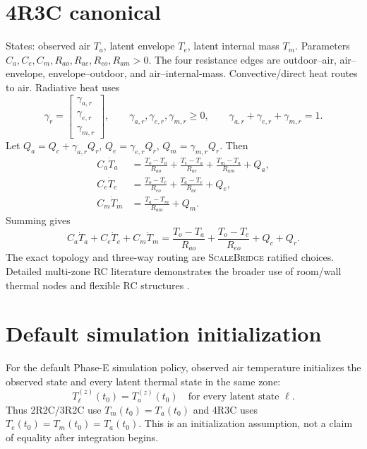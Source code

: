 \documentclass[11pt]{article}
\newcommand{\ScaleBridge}{\textsc{ScaleBridge}}
\begin{document}
\section{4R3C canonical}
States: observed air $T_a$, latent envelope $T_e$, latent internal mass $T_m$.  Parameters $C_a,C_e,C_m,R_{ao},R_{ae},R_{eo},R_{am}>0$.  The four resistance edges are outdoor--air, air--envelope, envelope--outdoor, and air--internal-mass.  Convective/direct heat routes to air.  Radiative heat uses
\[
\gamma_r=\begin{bmatrix}\gamma_{a,r}\\\gamma_{e,r}\\\gamma_{m,r}\end{bmatrix},\qquad
\gamma_{a,r},\gamma_{e,r},\gamma_{m,r}\ge0,\qquad
\gamma_{a,r}+\gamma_{e,r}+\gamma_{m,r}=1.
\]
Let $Q_a=Q_c+\gamma_{a,r}Q_r$, $Q_e=\gamma_{e,r}Q_r$, $Q_m=\gamma_{m,r}Q_r$. Then
\begin{align}
C_a\dot T_a &= \frac{T_o-T_a}{R_{ao}}+\frac{T_e-T_a}{R_{ae}}+\frac{T_m-T_a}{R_{am}}+Q_a,\\
C_e\dot T_e &= \frac{T_o-T_e}{R_{eo}}+\frac{T_a-T_e}{R_{ae}}+Q_e,\\
C_m\dot T_m &= \frac{T_a-T_m}{R_{am}}+Q_m.
\end{align}
Summing gives
\[
C_a\dot T_a+C_e\dot T_e+C_m\dot T_m
=\frac{T_o-T_a}{R_{ao}}+\frac{T_o-T_e}{R_{eo}}+Q_c+Q_r.
\]
The exact topology and three-way routing are \ScaleBridge{} ratified choices.  Detailed multi-zone RC literature demonstrates the broader use of room/wall thermal nodes and flexible RC structures \citep{BelicSliskovicHocenski2021MultiZoneRC,VallianosAthienitisDelcroix2022AutomaticMultiZoneRC}.

\section{Default simulation initialization}
For the default Phase-E simulation policy, observed air temperature initializes the observed state and every latent thermal state in the same zone:
\[
T_\ell^{(z)}(t_0)=T_a^{(z)}(t_0)\quad\text{for every latent state }\ell.
\]
Thus 2R2C/3R2C use $T_m(t_0)=T_a(t_0)$ and 4R3C uses $T_e(t_0)=T_m(t_0)=T_a(t_0)$. This is an initialization assumption, not a claim of equality after integration begins.



\end{document}
